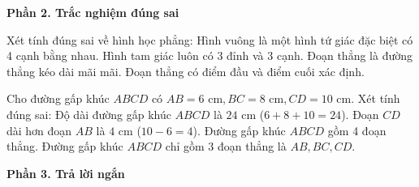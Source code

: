 \textbf{Phần 2. Trắc nghiệm đúng sai}

\begin{ex} %
Xét tính đúng sai về hình học phẳng:
\choiceTF
{\True Hình vuông là một hình tứ giác đặc biệt có 4 cạnh bằng nhau.}
{\True Hình tam giác luôn có 3 đỉnh và 3 cạnh.}
{Đoạn thẳng là đường thẳng kéo dài mãi mãi.}
{\True Đoạn thẳng có điểm đầu và điểm cuối xác định.}
\end{ex}

\begin{ex} %
Cho đường gấp khúc $ABCD$ có $AB = 6\text{ cm}, BC = 8\text{ cm}, CD = 10\text{ cm}$. Xét tính đúng sai:
\choiceTF
{\True Độ dài đường gấp khúc $ABCD$ là $24\text{ cm}$ ($6 + 8 + 10 = 24$).}
{\True Đoạn $CD$ dài hơn đoạn $AB$ là $4\text{ cm}$ ($10 - 6 = 4$).}
{Đường gấp khúc $ABCD$ gồm 4 đoạn thẳng.}
{\True Đường gấp khúc $ABCD$ chỉ gồm 3 đoạn thẳng là $AB, BC, CD$.}
\end{ex}

\textbf{Phần 3. Trả lời ngắn}

